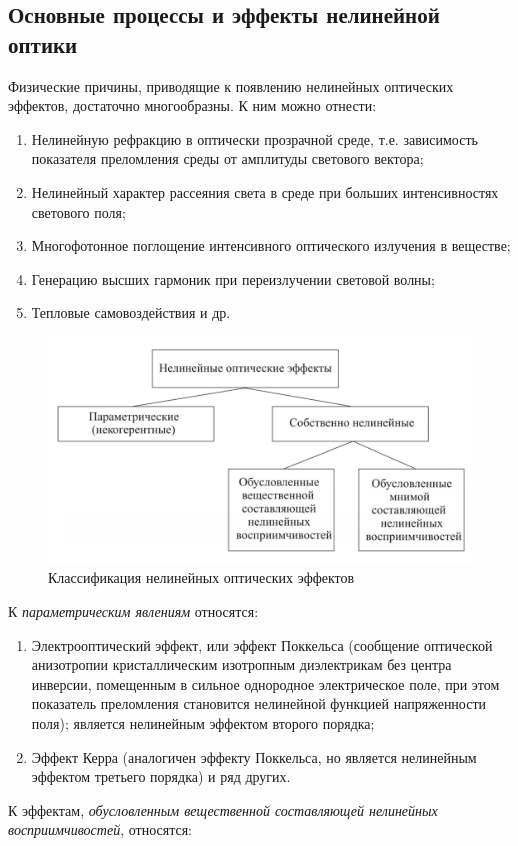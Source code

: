 \subsection{Основные процессы и эффекты нелинейной оптики}
Физические причины, приводящие к появлению нелинейных оптических эффектов, достаточно многообразны. К ним можно отнести:
\begin{enumerate}
\item  Нелинейную рефракцию в оптически прозрачной среде, т.е. зависимость показателя преломления среды от амплитуды светового вектора;
\item  Нелинейный характер рассеяния света в среде при больших интенсивностях светового поля;
\item  Многофотонное поглощение интенсивного оптического излучения в веществе;
\item  Генерацию высших гармоник при переизлучении световой волны;
\item  Тепловые самовоздействия и др.
\end{enumerate}
\begin{figure}[h]
	\centering
	\includegraphics[width=0.7\linewidth]{images/classific.png}
	\caption{Классификация нелинейных оптических эффектов}
	\label{classific}
\end{figure}
К \textit{параметрическим явлениям} относятся:
\begin{enumerate}
\item   Электрооптический эффект, или эффект Поккельса (сообщение оптической анизотропии кристаллическим изотропным диэлектрикам без центра инверсии, помещенным в сильное однородное электрическое поле, при этом показатель преломления становится нелинейной функцией напряженности поля); является нелинейным эффектом второго порядка;
\item Эффект Керра (аналогичен эффекту Поккельса, но является нелинейным эффектом третьего порядка) и ряд других.
\end{enumerate}
К эффектам, \textit{обусловленным вещественной составляющей нелинейных восприимчивостей}, относятся:
